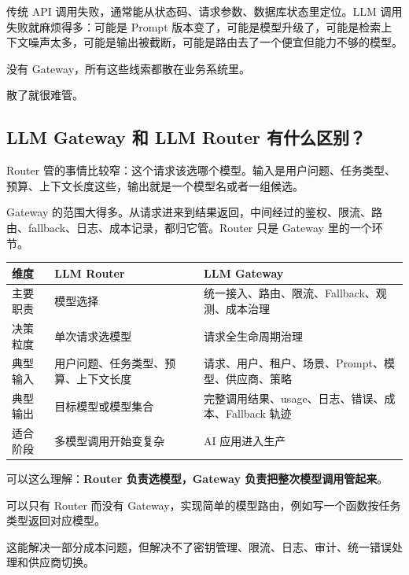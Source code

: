 \documentclass[9pt,a4paper,twocolumn]{ctexart}
\begin{document}
传统 API 调用失败，通常能从状态码、请求参数、数据库状态里定位。LLM 调用失败就麻烦得多：可能是 Prompt 版本变了，可能是模型升级了，可能是检索上下文噪声太多，可能是输出被截断，可能是路由去了一个便宜但能力不够的模型。



没有 Gateway，所有这些线索都散在业务系统里。



散了就很难管。



\subsection*{LLM Gateway 和 LLM Router 有什么区别？}


Router 管的事情比较窄：这个请求该选哪个模型。输入是用户问题、任务类型、预算、上下文长度这些，输出就是一个模型名或者一组候选。



Gateway 的范围大得多。从请求进来到结果返回，中间经过的鉴权、限流、路由、fallback、日志、成本记录，都归它管。Router 只是 Gateway 里的一个环节。


{\footnotesize
\begin{tabular}{|p{}|p{}|p{}|}
\hline
\textbf{维度} & \textbf{LLM Router} & \textbf{LLM Gateway} \\
\hline
主要职责 & 模型选择 & 统一接入、路由、限流、Fallback、观测、成本治理 \\
\hline
决策粒度 & 单次请求选模型 & 请求全生命周期治理 \\
\hline
典型输入 & 用户问题、任务类型、预算、上下文长度 & 请求、用户、租户、场景、Prompt、模型、供应商、策略 \\
\hline
典型输出 & 目标模型或模型集合 & 完整调用结果、usage、日志、错误、成本、Fallback 轨迹 \\
\hline
适合阶段 & 多模型调用开始变复杂 & AI 应用进入生产 \\
\hline
\end{tabular}
}



可以这么理解：\textbf{Router 负责选模型，Gateway 负责把整次模型调用管起来}。



可以只有 Router 而没有 Gateway，实现简单的模型路由，例如写一个函数按任务类型返回对应模型。



这能解决一部分成本问题，但解决不了密钥管理、限流、日志、审计、统一错误处理和供应商切换。
\end{document}
